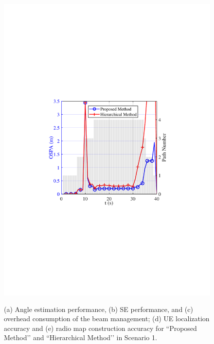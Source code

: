 \documentclass[journal,12pt,onecolumn,draftclsnofoot,]{IEEEtran}
\begin{document}
\begin{figure}
{\hspace{-0mm}\includegraphics[scale=0.46]{8-5.pdf}\hspace{-0mm}
}
\caption{
(a) Angle estimation performance, (b) SE performance, and (c) overhead consumption of the beam management; (d) UE localization accuracy and (e) radio map construction accuracy for ``Proposed Method’’ and ``Hierarchical Method’’ in Scenario 1. 
}
\label{h}
\vspace{-10mm}
\end{figure}
\end{document}
